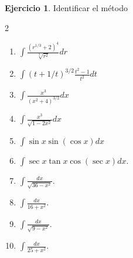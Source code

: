 \documentclass[12pt]{article}
\theoremstyle{definition}
\newtheorem{Ejer}[teorema]{Ejercicio}
\theoremstyle{remark}
\begin{document}
\begin{Ejer}{Identificar el método}
\begin{multicols}{2}
\begin{enumerate}[resume=integrales]
\item $\int\frac{(r^{1/3}+2)^4}{\sqrt[3]{r^2}}dr$ 
\item $\int(t+1/t)^{3/2}\frac{t^2-1}{t^2}dt$
\item $\int\frac{x^3}{(x^2+4)^{3/2}}dx$ 
\item $\int\frac{x^3}{\sqrt{1-2x^2}}dx$ 
\item $\int\sin x\sin(\cos x)dx$ 
\item $\int\sec x\tan x\cos(\sec x)dx$.
\item $\displaystyle \int\frac{dx}{\sqrt{36-x^2}}$.
\item $\displaystyle \int\frac{dx}{16+x^2}$.
\item $\displaystyle \int\frac{dx}{\sqrt{9-x^2}}$.
\item $\displaystyle \int\frac{dx}{25+x^2}$.


\end{enumerate}
\end{multicols}
\end{Ejer}
\end{document}
